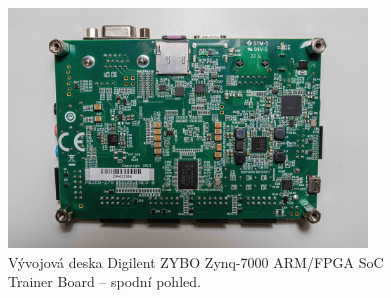 \documentclass[a4paper, twoside, 11pt]{article}
\begin{document}
				\begin{figure}[H]
					\centering
						\includegraphics[width=0.85\textwidth]{src/jpg/digilent-zybo-foto-3.jpeg} 
						\caption{Vývojová deska Digilent ZYBO Zynq-7000 ARM/FPGA SoC Trainer Board – spodní pohled.}
						\label{fig:digilent-zybo-foto-3}
				\end{figure}
\end{document}
